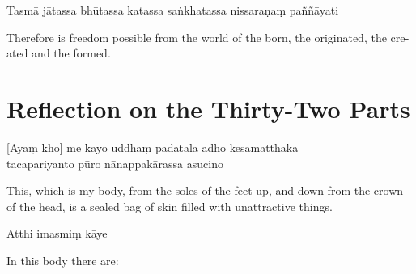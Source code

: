 Tasmā jātassa bhūtassa katassa saṅkhatassa nissaraṇaṃ paññāyati

\begin{english}
  Therefore is freedom possible from the world of the born, the originated, the created and the formed. 
\end{english}

\section{Reflection on the Thirty-Two Parts}

\begin{leader}
\end{leader}


[Ayaṃ kho] me kāyo uddhaṃ pādatalā adho kesamatthakā\\
tacapariyanto pūro nānappakārassa asucino

\begin{english}
  This, which is my body, from the soles of the feet up, and down from the crown of the head, is a sealed bag of skin filled with unattractive things.
\end{english}

Atthi imasmiṃ kāye

\begin{english}
  In this body there are:
\end{english}

